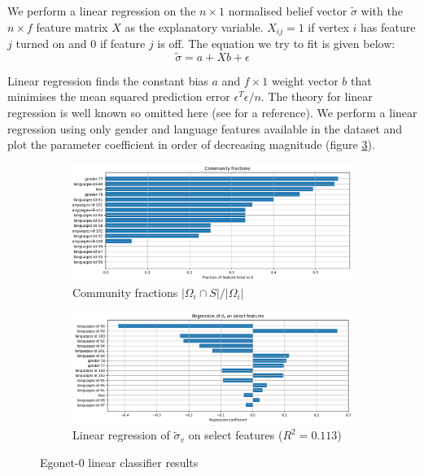 \documentclass[11pt]{article}
\begin{document}
\begin{multicols*}{2}
We perform a linear regression on the $n \times 1$ normalised belief vector $\tilde{\sigma}$ with the $n \times f$ feature matrix $X$ as the explanatory variable. $X_{ij} = 1$ if vertex $i$ has feature $j$ turned on and $0$ if feature $j$ is off. The equation we try to fit is given below:
%
\begin{equation}
	\tilde{\sigma} = a + X b + \epsilon
	\label{eqn:lin-regression}
\end{equation}

Linear regression finds the constant bias $a$ and $f \times 1$ weight vector $b$ that minimises the mean squared prediction error $\epsilon^T \epsilon / n$. The theory for linear regression is well known so omitted here (see \cite{yale-linear-regression} for a reference). We perform a linear regression using only gender and language features available in the dataset and plot the parameter coefficient in order of decreasing magnitude (figure \ref{fig:abp-output-lin-regression}).
%
\begin{figure}[H]
	\centering
	\begin{subfigure}{\linewidth}
		\includegraphics[width=\linewidth]{ego-0-abp-community-fractions.png}
		\caption{Community fractions $|\Omega_i \cap S| / |\Omega_i|$}
		\label{fig:abp-output-community-fractions}
	\end{subfigure}
	\begin{subfigure}{\linewidth}
		\includegraphics[width=\linewidth]{ego-0-abp-lin-regression.png}
		\caption{Linear regression of $\tilde{\sigma}_v$ on select features ($R^2 = 0.113$)}
		\label{fig:abp-output-lin-regression}
	\end{subfigure}
	\caption{Egonet-0 linear classifier results}
\end{figure}


\end{multicols*}
\end{document}
